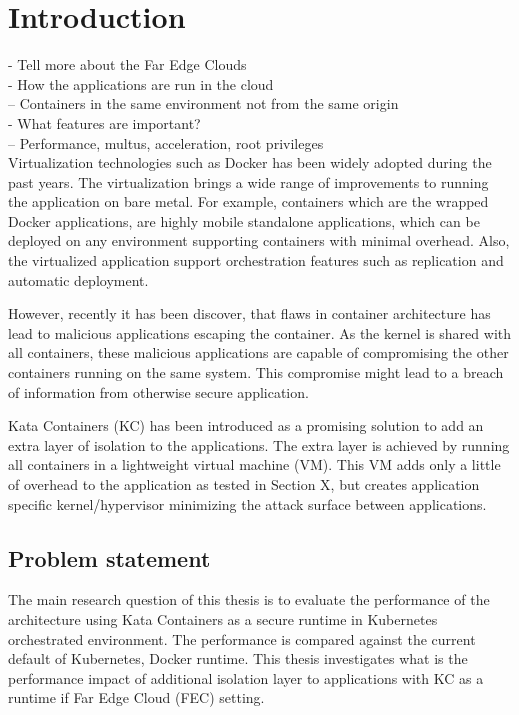 \chapter{Introduction}
\label{chapter:intro}

- Tell more about the Far Edge Clouds \\
- How the applications are run in the cloud \\
-- Containers in the same environment not from the same origin \\
- What features are important? \\
-- Performance, multus, acceleration, root privileges \\


Virtualization technologies such as Docker has been widely adopted during the past years. The virtualization brings a wide range of improvements to running the application on bare metal. For example, containers which are the wrapped Docker applications, are highly mobile standalone applications, which can be deployed on any environment supporting containers with minimal overhead. Also, the virtualized application support orchestration features such as replication and automatic deployment.


However, recently it has been discover, that flaws in container architecture has lead to malicious applications escaping the container. As the kernel is shared with all containers, these malicious applications are capable of compromising the other containers running on the same system. This compromise might lead to a breach of information from otherwise secure application.

Kata Containers (KC) \cite{KataContainers} has been introduced as a promising solution to add an extra layer of isolation to the applications. The extra layer is achieved by running all containers in a lightweight virtual machine (VM). This VM adds only a little of overhead to the application as tested in Section X, but creates application specific kernel/hypervisor minimizing the attack surface between applications.




\section{Problem statement}
\label{section:intro_problemstatement}

The main research question of this thesis is to evaluate the performance of the architecture using Kata Containers as a secure runtime in Kubernetes orchestrated environment. The performance is compared against the current default of Kubernetes, Docker runtime. This thesis investigates what is the performance impact of additional isolation layer to applications with KC as a runtime if Far Edge Cloud (FEC) setting.

